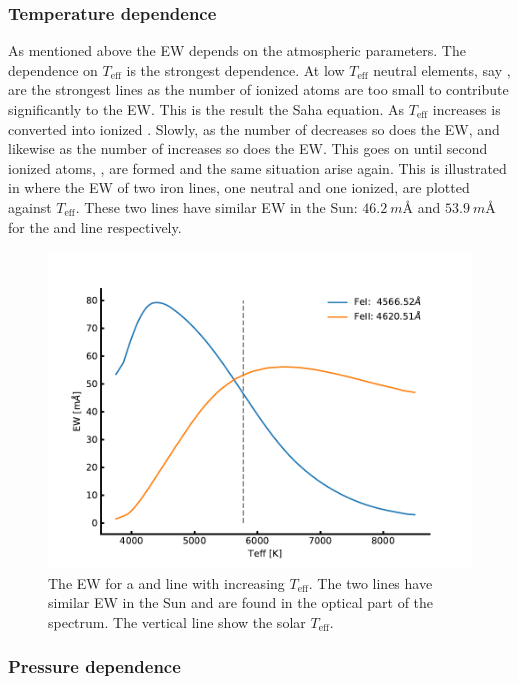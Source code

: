 \subsubsection{Temperature dependence}

As mentioned above the EW depends on the atmospheric parameters. The dependence on $T_\mathrm{eff}$
is the strongest dependence. At low $T_\mathrm{eff}$ neutral elements, say , are the
strongest lines as the number of ionized atoms are too small to contribute significantly to the EW.
This is the result the Saha equation. As $T_\mathrm{eff}$ increases  is converted into
ionized . Slowly, as the number of  decreases so does the EW, and likewise as
the number of  increases so does the EW. This goes on until second ionized atoms,
, are formed and the same situation arise again. This is illustrated in
 where the EW of two iron lines, one neutral and one ionized, are plotted against
$T_\mathrm{eff}$. These two lines have similar EW in the Sun: $\SI{46.2}{m\angstrom}$ and
$\SI{53.9}{m\angstrom}$ for the  and  line respectively.

\begin{figure}[htpb!]
    \centering
    \includegraphics[width=0.85\linewidth]{figures/ewTeff.pdf}
    \caption{The EW for a  and  line with increasing $T_\mathrm{eff}$. The
             two lines have similar EW in the Sun and are found in the optical part of the spectrum.
             The vertical line show the solar $T_\mathrm{eff}$.}
    \label{fig:ewTeff}
\end{figure}


\subsubsection{Pressure dependence}

